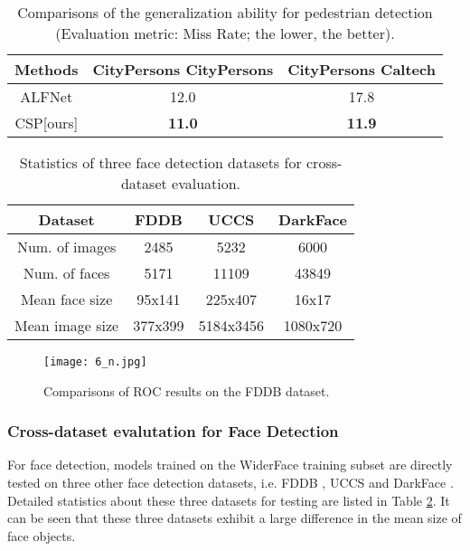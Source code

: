 \begin{table}
\begin{center}
\begin{tabular}{c|c|c}
\hline
Methods & CityPersons  CityPersons & CityPersons  Caltech\\
\hline
\hline
ALFNet\cite{Liu_2018_ECCV} & 12.0 & 17.8\\
\hline
CSP[ours] & \textbf{11.0} & \textbf{11.9}\\
\hline
\end{tabular}
\end{center}
\caption{Comparisons of the generalization ability for pedestrian detection (Evaluation metric: Miss Rate; the lower, the better).}
\label{table:1}
\end{table}

\begin{table}
\begin{center}
\begin{tabular}{c|c|c|c}
\hline
Dataset & FDDB \cite{fddbTech} & UCCS \cite{uccs} & DarkFace \cite{wei2018deep}\\
\hline
\hline
Num. of images & 2485 & 5232 & 6000\\
\hline
Num. of faces & 5171 & 11109 & 43849\\
\hline
Mean face size & 95x141 & 225x407 & 16x17\\
\hline
Mean image size & 377x399 & 5184x3456 & 1080x720\\
\hline
\end{tabular}
\end{center}
\caption{Statistics of three face detection datasets for cross-dataset evaluation.}
\label{table:2}
\end{table}

\begin{figure*}[t]
\begin{center}
\texttt{[image: 6\_n.jpg]}
\end{center}
   \caption{Comparisons of ROC results on the FDDB dataset.}
\label{fig:fddb}
\end{figure*}

\subsubsection{Cross-dataset evalutation for Face Detection}
For face detection, models trained on the WiderFace \cite{yang2016wider} training subset are directly tested on three other face detection datasets, i.e. FDDB \cite{fddbTech}, UCCS \cite{uccs} and DarkFace \cite{wei2018deep}. Detailed statistics about these three datasets for testing are listed in Table \ref{table:2}. It can be seen that these three datasets exhibit a large difference in the mean size of face objects.

